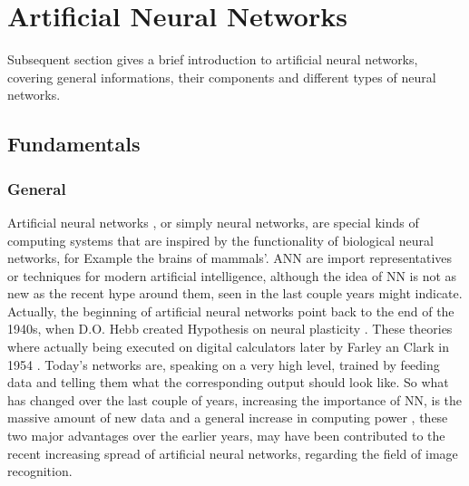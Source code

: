 \chapter{Artificial Neural Networks}\label{chapter:Artificial Neural Networks}
Subsequent section gives a brief introduction to artificial neural networks, covering general informations, their components and different types of neural networks.

\section{Fundamentals}
\subsection{General}
Artificial neural networks , or simply neural networks, are special kinds of computing systems that are inspired by the functionality of biological neural networks, for Example the brains of mammals'. ANN are import representatives or techniques for modern artificial intelligence, although the idea of NN is not as new as the recent hype around them, seen in the last couple years might indicate. Actually, the beginning of artificial neural networks point back to the end of the 1940s, when D.O. Hebb created Hypothesis on neural plasticity \cite{hebb}. These theories where actually being executed on digital calculators later by Farley an Clark in 1954 \cite{farleyclark}. Today's networks are, speaking on a very high level,  trained by feeding data and telling them what the corresponding output should look like. \newline
So what has changed over the last couple of years, increasing the importance of NN, is the massive amount of new data and a general increase in computing power \cite{moore}, these two major advantages over the earlier years, may have been contributed to the recent increasing spread of artificial neural networks, regarding the field of image recognition.

